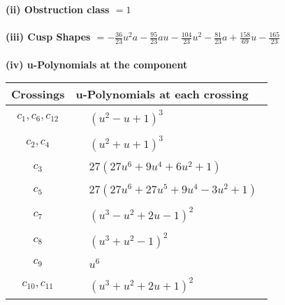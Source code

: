\documentclass[1p]{elsarticle_modified}
\theoremstyle{definition}
\begin{document}
\flushleft \textbf{(ii) Obstruction class $= 1$}\\~\\
\flushleft \textbf{(iii) Cusp Shapes $= -\frac{36}{23} u^2 a-\frac{95}{23} a u-\frac{104}{23} u^2-\frac{81}{23} a+\frac{158}{69} u-\frac{165}{23}$}\\~\\
\newpage\renewcommand{\arraystretch}{1}
\flushleft \textbf{(iv) u-Polynomials at the component}\newline \\
\begin{tabular}{m{50pt}|m{274pt}}
Crossings & \hspace{64pt}u-Polynomials at each crossing \\
\hline $$\begin{aligned}c_{1},c_{6},c_{12}\end{aligned}$$&$\begin{aligned}
&(u^2- u+1)^3
\end{aligned}$\\
\hline $$\begin{aligned}c_{2},c_{4}\end{aligned}$$&$\begin{aligned}
&(u^2+u+1)^3
\end{aligned}$\\
\hline $$\begin{aligned}c_{3}\end{aligned}$$&$\begin{aligned}
&27(27 u^6+9 u^4+6 u^2+1)
\end{aligned}$\\
\hline $$\begin{aligned}c_{5}\end{aligned}$$&$\begin{aligned}
&27(27 u^6+27 u^5+9 u^4-3 u^2+1)
\end{aligned}$\\
\hline $$\begin{aligned}c_{7}\end{aligned}$$&$\begin{aligned}
&(u^3- u^2+2 u-1)^2
\end{aligned}$\\
\hline $$\begin{aligned}c_{8}\end{aligned}$$&$\begin{aligned}
&(u^3+u^2-1)^2
\end{aligned}$\\
\hline $$\begin{aligned}c_{9}\end{aligned}$$&$\begin{aligned}
&u^6
\end{aligned}$\\
\hline $$\begin{aligned}c_{10},c_{11}\end{aligned}$$&$\begin{aligned}
&(u^3+u^2+2 u+1)^2
\end{aligned}$\\
\hline
\end{tabular}\\~\\
\end{document}
